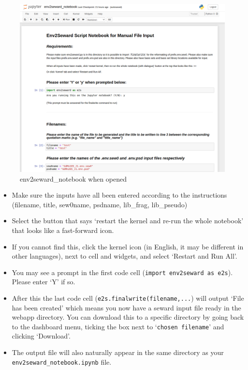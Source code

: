 \begin{figure}
	\centering
	\includegraphics[width=1.3\linewidth]{../manuals/e2s_disp_manual/notebook.png}
	\caption{env2seward\_notebook when opened}
	\label{fig:screenshot-from-2020-06-23-12-26-25}
\end{figure}



\begin{itemize}
	\item Make sure the inputs have all been entered according to the instructions (filename, title, sew0name, psdname, lib\_frag, lib\_pseudo)
	\item Select the button that says `restart the kernel and re-run the whole notebook' that looks like a fast-forward icon.
	\item If you cannot find this, click the kernel icon (in English, it may be different in other languages), next to cell and widgets, and select `Restart and Run All'.
	\item You may see a prompt in the first code cell (\texttt{import env2seward as e2s}). Please enter `Y' if so.
	\item After this the last code cell (\texttt{e2s.finalwrite(filename,...}) will output `File has been created' which means you now have a seward input file ready in the webapp directory. You can download this to a specific directory by going back to the dashboard menu, ticking the box next to `\texttt{chosen filename}' and clicking `Download'.
	\item The output file will also naturally appear in the same directory as your \texttt{env2seward\_notebook.ipynb} file.
        \end{itemize}


